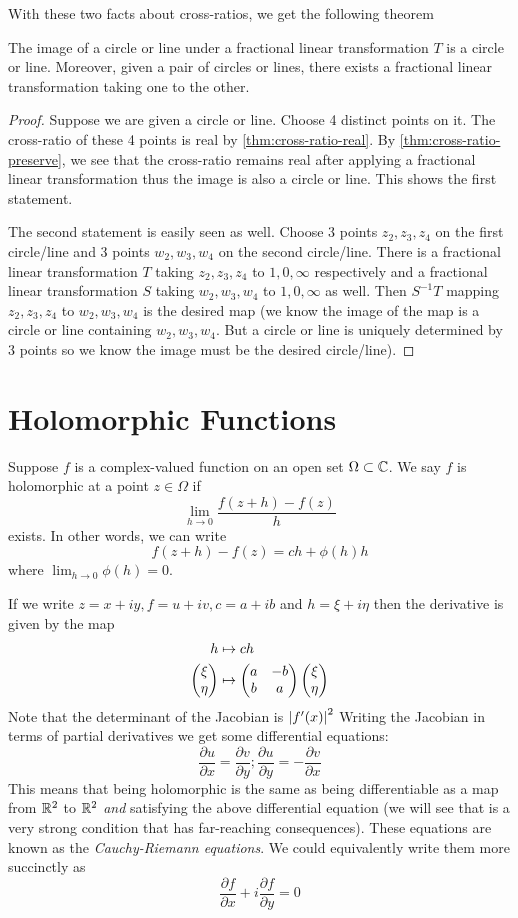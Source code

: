 With these two facts about cross-ratios, we get the following theorem
\begin{theorem}
The image of a circle or line under a fractional linear transformation $T$ is a circle or line. Moreover, given a pair of circles or lines, there exists a fractional linear transformation taking one to the other.
\end{theorem}
\begin{proof}
Suppose we are given a circle or line. Choose 4 distinct points on it. The cross-ratio of these 4 points is real by \autoref{thm:cross-ratio-real}. By \autoref{thm:cross-ratio-preserve}, we see that the cross-ratio remains real after applying a fractional linear transformation thus the image is also a circle or line. This shows the first statement.

The second statement is easily seen as well. Choose 3 points $z_2, z_3, z_4$ on the first circle/line and 3 points $w_2, w_3, w_4$ on the second circle/line. There is a fractional linear transformation $T$ taking $z_2, z_3, z_4$ to $1, 0, \infty$ respectively and a fractional linear transformation $S$ taking $w_2, w_3, w_4$ to $1, 0, \infty$ as well. Then $S^{-1}T$ mapping $z_2, z_3, z_4$ to $w_2, w_3, w_4$ is the desired map (we know the image of the map is a circle or line containing $w_2, w_3, w_4$. But a circle or line is uniquely determined by 3 points so we know the image must be the desired circle/line).
\end{proof}

\section{Holomorphic Functions}\label{sec:holomorphic-functions}
Suppose $f$ is a complex-valued function on an open set $\Omega \subset \mathbb{C}$. We say $f$ is holomorphic at a point $z \in \Omega$ if 
$$ \lim_{h \to 0} \frac{f(z + h) - f(z)}{h} $$
exists. In other words, we can write
$$ f(z + h) - f(z) = ch + \phi(h)h $$ where $\lim_{h \to 0} \phi(h) = 0$.

If we write $z = x + iy, f = u + iv, c = a + ib$ and $h = \xi + i \eta$ then the derivative is given by the map
\begin{align*}
    h &\mapsto ch\\
    \begin{pmatrix} \xi \\ \eta \end{pmatrix} &\mapsto \begin{pmatrix} a & -b\\b & a \end{pmatrix} \begin{pmatrix} \xi \\ \eta \end{pmatrix}
\end{align*}
Note that the determinant of the Jacobian is $\left|f'(x)\right|^2$
Writing the Jacobian in terms of partial derivatives we get some differential equations:
$$ \frac{\partial u}{\partial x} = \frac{\partial v}{\partial y}; \frac{\partial u}{\partial y} = -\frac{\partial v}{\partial x} $$
This means that being holomorphic is the same as being differentiable as a map from $\mathbb{R}^2$ to $\mathbb{R}^2$ \textit{and} satisfying the above differential equation (we will see that is a very strong condition that has far-reaching consequences). These equations are known as the \textit{Cauchy-Riemann equations}. We could equivalently write them more succinctly as
$$ \frac{\partial f}{\partial x} + i \frac{\partial f}{\partial y} = 0 $$

